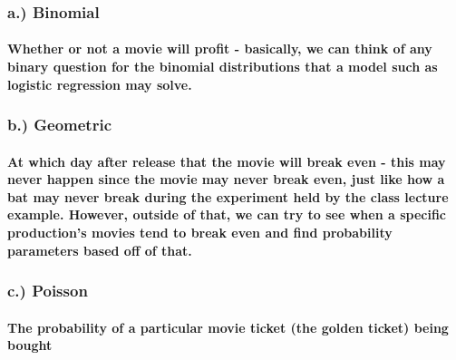\documentclass[]{article}
\let\oldparagraph\paragraph
\renewcommand{\paragraph}[1]{\oldparagraph{#1}\mbox{}}
\begin{document}
\subsubsection{a.) Binomial}\label{a.-binomial}

\paragraph{Whether or not a movie will profit - basically, we can think
of any binary question for the binomial distributions that a model such
as logistic regression may
solve.}\label{whether-or-not-a-movie-will-profit---basically-we-can-think-of-any-binary-question-for-the-binomial-distributions-that-a-model-such-as-logistic-regression-may-solve.}

\subsubsection{b.) Geometric}\label{b.-geometric}

\paragraph{At which day after release that the movie will break even -
this may never happen since the movie may never break even, just like
how a bat may never break during the experiment held by the class
lecture example. However, outside of that, we can try to see when a
specific production's movies tend to break even and find probability
parameters based off of
that.}\label{at-which-day-after-release-that-the-movie-will-break-even---this-may-never-happen-since-the-movie-may-never-break-even-just-like-how-a-bat-may-never-break-during-the-experiment-held-by-the-class-lecture-example.-however-outside-of-that-we-can-try-to-see-when-a-specific-productions-movies-tend-to-break-even-and-find-probability-parameters-based-off-of-that.}

\subsubsection{c.) Poisson}\label{c.-poisson}

\paragraph{The probability of a particular movie ticket (the golden
ticket) being
bought}\label{the-probability-of-a-particular-movie-ticket-the-golden-ticket-being-bought}
\end{document}
